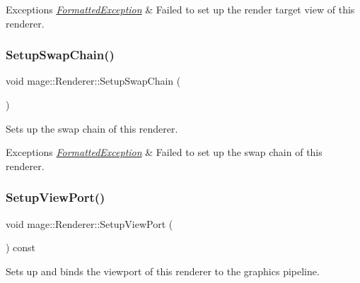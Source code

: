 \begin{DoxyExceptions}{Exceptions}
{\em \hyperlink{structmage_1_1_formatted_exception}{Formatted\+Exception}} & Failed to set up the render target view of this renderer. \\
\hline
\end{DoxyExceptions}
\hypertarget{classmage_1_1_renderer_a8d3030611390f69120f1e5b91225eddf}{}\label{classmage_1_1_renderer_a8d3030611390f69120f1e5b91225eddf} 
\subsubsection{\texorpdfstring{Setup\+Swap\+Chain()}{SetupSwapChain()}}
{\footnotesize\ttfamily void mage\+::\+Renderer\+::\+Setup\+Swap\+Chain (\begin{DoxyParamCaption}{ }\end{DoxyParamCaption})\hspace{0.3cm}{\ttfamily [private]}}

Sets up the swap chain of this renderer.


\begin{DoxyExceptions}{Exceptions}
{\em \hyperlink{structmage_1_1_formatted_exception}{Formatted\+Exception}} & Failed to set up the swap chain of this renderer. \\
\hline
\end{DoxyExceptions}
\hypertarget{classmage_1_1_renderer_ab60757e174f0f82089361a0d46a1eacc}{}\label{classmage_1_1_renderer_ab60757e174f0f82089361a0d46a1eacc} 
\subsubsection{\texorpdfstring{Setup\+View\+Port()}{SetupViewPort()}}
{\footnotesize\ttfamily void mage\+::\+Renderer\+::\+Setup\+View\+Port (\begin{DoxyParamCaption}{ }\end{DoxyParamCaption}) const\hspace{0.3cm}{\ttfamily [private]}}

Sets up and binds the viewport of this renderer to the graphics pipeline. \hypertarget{classmage_1_1_renderer_a9004ab608659188900c808eacb5f873c}{}\label{classmage_1_1_renderer_a9004ab608659188900c808eacb5f873c} 
